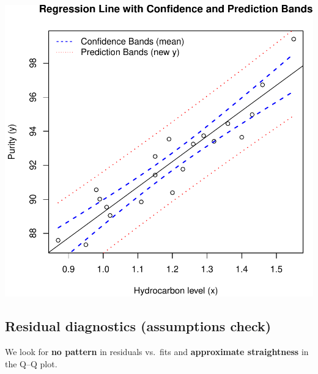 \documentclass[
  letterpaper,
]{scrbook}
\begin{document}
\includegraphics{unit2-slr/slr_files/figure-pdf/plot-bands-1.pdf}

\subsection{Residual diagnostics (assumptions
check)}\label{residual-diagnostics-assumptions-check}

We look for \textbf{no pattern} in residuals vs.~fits and
\textbf{approximate straightness} in the Q--Q plot.
\end{document}
